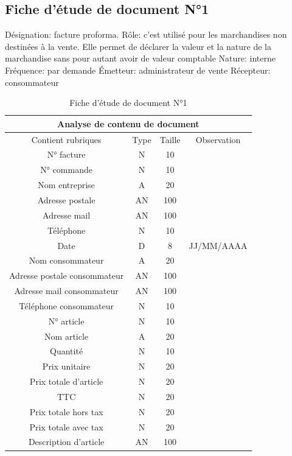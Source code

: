 \documentclass[edit,12pt,a4paper,ChapStyle,oneside,doubleinterligne]{report}
\begin{document}
\subsection{Fiche d’étude de document N°1}
\noindent Désignation: facture proforma.
\newline Rôle: c’est utilisé pour les marchandises non destinées à la vente. Elle permet de déclarer la valeur et la nature de la marchandise sans pour autant avoir de valeur comptable
\newline Nature: interne
\newline Fréquence: par demande
\newline Émetteur: administrateur de vente
\newline Récepteur: consommateur \cite{Facturep}
\begin{table}[h!]
    \centering
    \begin{tabular}{|c|c|c|c|}
         \hline
\multicolumn{4}{|c|}{Analyse de contenu de document}\\
\hline
Contient rubriques & Type & Taille & Observation\\
\hline
 N° facture  & N & 10 & \\
 N° commande  & N & 10 & \\
 Nom entreprise & A & 20 & \\
 Adresse postale & AN & 100 & \\
 Adresse mail & AN & 100 & \\
 Téléphone & N & 10 & \\
Date & D & 8 & JJ/MM/AAAA \\
Nom consommateur & A & 20 & \\
Adresse postale consommateur & AN & 100 & \\
Adresse mail consommateur & AN & 100 & \\
Téléphone consommateur & N & 10 & \\
N° article & N & 10 & \\
Nom article & A & 20 & \\
Quantité & N & 10 & \\
Prix unitaire & N & 20 & \\
Prix totale d’article & N & 20 & \\
TTC & N & 20 & \\
Prix totale hors tax & N & 20 & \\
Prix totale avec tax & N & 20 & \\
Description d’article & AN & 100 & \\
\hline
    \end{tabular}
    \caption{Fiche d’étude de document N°1}
    \label{tab:1}
\end{table}
\newpage
\end{document}
